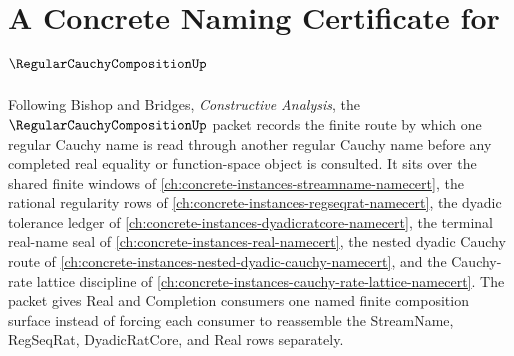 \chapter{A Concrete Naming Certificate for $\RegularCauchyCompositionUp$}
\label{ch:concrete-instances-regular-cauchy-composition-namecert}

Following Bishop and Bridges, \emph{Constructive Analysis}, the $\RegularCauchyCompositionUp$ packet records the finite route by which one regular Cauchy name is read through another regular Cauchy name before any completed real equality or function-space object is consulted. It sits over the shared finite windows of \autoref{ch:concrete-instances-streamname-namecert}, the rational regularity rows of \autoref{ch:concrete-instances-regseqrat-namecert}, the dyadic tolerance ledger of \autoref{ch:concrete-instances-dyadicratcore-namecert}, the terminal real-name seal of \autoref{ch:concrete-instances-real-namecert}, the nested dyadic Cauchy route of \autoref{ch:concrete-instances-nested-dyadic-cauchy-namecert}, and the Cauchy-rate lattice discipline of \autoref{ch:concrete-instances-cauchy-rate-lattice-namecert}. The packet gives Real and Completion consumers one named finite composition surface instead of forcing each consumer to reassemble the StreamName, RegSeqRat, DyadicRatCore, and Real rows separately.

